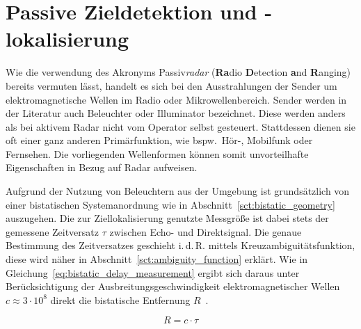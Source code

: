 \section{Passive Zieldetektion und -lokalisierung}

Wie die verwendung des Akronyms Passiv\emph{radar} (\textbf{Ra}dio %
\textbf{D}etection %
\textbf{a}nd \textbf{R}anging) bereits vermuten lässt, handelt es sich bei den Ausstrahlungen der Sender um elektromagnetische Wellen im Radio oder Mikrowellenbereich. Sender werden in der Literatur auch Beleuchter oder Illuminator bezeichnet. Diese werden anders als bei aktivem Radar nicht vom Operator selbst gesteuert. Stattdessen dienen sie oft einer ganz anderen Primärfunktion, wie bspw.\ Hör-, Mobilfunk oder Fernsehen. Die vorliegenden Wellenformen können somit unvorteilhafte Eigenschaften in Bezug auf Radar aufweisen.

Aufgrund der Nutzung von Beleuchtern aus der Umgebung ist grundsätzlich von einer bistatischen Systemanordnung wie in Abschnitt~\ref{sct:bistatic_geometry} auszugehen. Die zur Ziellokalisierung genutzte Messgröße ist dabei stets der gemessene Zeitversatz \(\tau \) zwischen Echo- und Direktsignal. Die genaue Bestimmung des Zeitversatzes geschieht i.\,d.\,R. mittels Kreuzambiguitätsfunktion, diese wird näher in Abschnitt~\ref{sct:ambiguity_function} erklärt. Wie in Gleichung~\ref{eq:bistatic_delay_measurement} ergibt sich daraus unter Berücksichtigung der Ausbreitungsgeschwindigkeit elektromagnetischer Wellen \(c \approx 3\cdot10^8\) direkt die bistatische Entfernung \(R\)~\cite[S.~11]{Malanowski2019}.

\begin{equation}
    R = c \cdot \tau
\end{equation}\label{eq:bistatic_delay_measurement}

